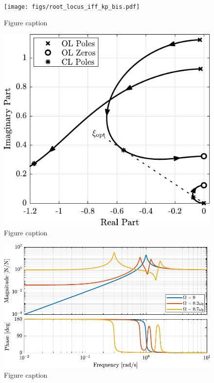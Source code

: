 \documentclass{ISMA_USD2020}
\begin{document}
\begin{figure}[htbp]
\centering
\texttt{[image: figs/root\_locus\_iff\_kp\_bis.pdf]}
\caption{\label{fig:root_locus_iff_kp_bis}Figure caption}
\end{figure}

\begin{figure}[htbp]
\centering
\includegraphics[scale=1]{figs/root_locus_opt_gain_iff_kp.pdf}
\caption{\label{fig:root_locus_opt_gain_iff_kp}Figure caption}
\end{figure}

\begin{figure}[htbp]
\centering
\includegraphics[scale=1]{figs/plant_iff_compare_rotating_speed.pdf}
\caption{\label{fig:plant_iff_compare_rotating_speed}Figure caption}
\end{figure}
\end{document}
